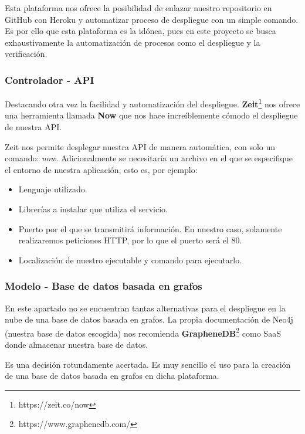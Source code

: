 Esta plataforma nos ofrece la posibilidad de enlazar nuestro repositorio en GitHub con Heroku y automatizar proceso de despliegue con un simple comando. Es por ello que esta plataforma es la idónea, pues en este proyecto se busca exhaustivamente la automatización de procesos como el despliegue y la verificación.

\subsubsection{Controlador - API}

Destacando otra vez la facilidad y automatización del despliegue. \textbf{Zeit}\footnote{https://zeit.co/now} nos ofrece una herramienta llamada \textbf{Now} que nos hace increíblemente cómodo el despliegue de nuestra API.

Zeit nos permite desplegar nuestra API de manera automática, con solo un comando: \textit{now}. Adicionalmente se necesitaría un archivo en el que se especifique el entorno de nuestra aplicación, esto es, por ejemplo:

\begin{itemize}
    \item Lenguaje utilizado.
    \item Librerías a instalar que utiliza el servicio.
    \item Puerto por el que se transmitirá información. En nuestro caso, solamente realizaremos peticiones HTTP, por lo que el puerto será el 80.
    \item Localización de nuestro ejecutable y comando para ejecutarlo.
\end{itemize}

\subsubsection{Modelo - Base de datos basada en grafos}

En este apartado no se encuentran tantas alternativas para el despliegue en la nube de una base de datos basada en grafos. La propia documentación de Neo4j (nuestra base de datos escogida) nos recomienda \textbf{GrapheneDB}\footnote{https://www.graphenedb.com/} como SaaS donde almacenar nuestra base de datos.

Es una decisión rotundamente acertada. Es muy sencillo el uso para la creación de una base de datos basada en grafos en dicha plataforma.
